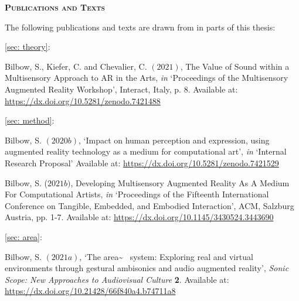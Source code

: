 \newpage
{}
{}
\begin{flushleft}
	\Huge \textsc{\textbf{Publications and Texts}}

\end{flushleft}
\noindent The following publications and texts are drawn from in parts of this thesis:

\noindent\autoref{sec: theory}:  \\ \citep{bilbow2021}

\begin{hangparas}{.25in}{1}
	Bilbow, S., Kiefer, C. and Chevalier, C. $(2021)$, The Value of Sound within a Multisensory Approach to AR in the Arts, \textit{in} `Proceedings of the Multisensory Augmented Reality Workshop', Interact, Italy, p. 8. Available at: \url{https://dx.doi.org/10.5281/zenodo.7421488}
\end{hangparas}

\vspace*{0.75cm}
\noindent\autoref{sec: method}:  \\ \citep{bilbow2020,bilbow2021b}

\begin{hangparas}{.25in}{1}
	Bilbow, S. $(2020b)$, `Impact on human perception and expression, using augmented reality technology as a medium for computational art', \textit{in} `Internal Research Proposal' Available at: \url{https://dx.doi.org/10.5281/zenodo.7421529}
\end{hangparas}

\begin{hangparas}{.25in}{1}
	Bilbow, S. ($2021b)$, Developing Multisensory Augmented Reality As A Medium For Computational Artists, \textit{in} `Proceedings of the Fifteenth International Conference on Tangible, Embedded, and Embodied Interaction', ACM, Salzburg Austria, pp. 1-7. Available at: \url{https://dx.doi.org/10.1145/3430524.3443690}
\end{hangparas}

\vspace*{0.75cm}
\noindent\autoref{sec: area}:  \\ \citep{bilbow2021a}

\begin{hangparas}{.25in}{1}
	Bilbow, S. $(2021a)$, `The area\textasciitilde{}~ system: Exploring real and virtual environments through gestural ambisonics and audio augmented reality', \textit{Sonic Scope: New Approaches to Audiovisual Culture} \textbf{2}. Available at: \url{https://dx.doi.org/10.21428/66f840a4.b74711a8}
\end{hangparas}

